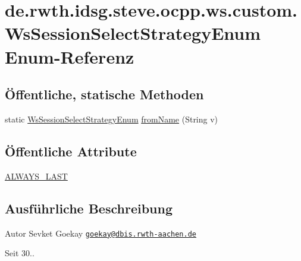 \hypertarget{enumde_1_1rwth_1_1idsg_1_1steve_1_1ocpp_1_1ws_1_1custom_1_1_ws_session_select_strategy_enum}{\section{de.\-rwth.\-idsg.\-steve.\-ocpp.\-ws.\-custom.\-Ws\-Session\-Select\-Strategy\-Enum Enum-\/\-Referenz}
\label{enumde_1_1rwth_1_1idsg_1_1steve_1_1ocpp_1_1ws_1_1custom_1_1_ws_session_select_strategy_enum}
}
\subsection*{Öffentliche, statische Methoden}
\begin{DoxyCompactItemize}
\item 
static \hyperlink{enumde_1_1rwth_1_1idsg_1_1steve_1_1ocpp_1_1ws_1_1custom_1_1_ws_session_select_strategy_enum}{Ws\-Session\-Select\-Strategy\-Enum} \hyperlink{enumde_1_1rwth_1_1idsg_1_1steve_1_1ocpp_1_1ws_1_1custom_1_1_ws_session_select_strategy_enum_af0a5e58a028ed213dbf697fc4e28561a}{from\-Name} (String v)
\end{DoxyCompactItemize}
\subsection*{Öffentliche Attribute}
\begin{DoxyCompactItemize}
\item 
\hyperlink{enumde_1_1rwth_1_1idsg_1_1steve_1_1ocpp_1_1ws_1_1custom_1_1_ws_session_select_strategy_enum_ab2256081cfc6924853236570b489de0b}{A\-L\-W\-A\-Y\-S\-\_\-\-L\-A\-S\-T}
\end{DoxyCompactItemize}


\subsection{Ausführliche Beschreibung}
\begin{DoxyAuthor}{Autor}
Sevket Goekay \href{mailto:goekay@dbis.rwth-aachen.de}{\tt goekay@dbis.\-rwth-\/aachen.\-de} 
\end{DoxyAuthor}
\begin{DoxySince}{Seit}
30.. 
\end{DoxySince}


